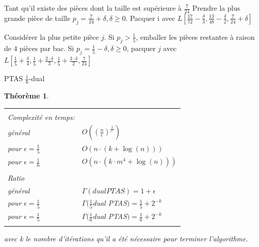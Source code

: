 \documentclass[a4paper,12pt]{report}
\theoremstyle{plain}				%
\newtheorem{theoreme}{Théorème}	%
\theoremstyle{definition}				%
\begin{document}
\begin{algorithm}[H]
Tant qu'il existe des pièces dont la taille est supérieure à $\frac{7}{24}$
Prendre la plus grande pièce de taille $p_j = \frac{7}{24}+\delta, \delta \geq 0$.
Pacquer i avec
$L[\frac{17}{72}-\frac{\delta}{3},
   \frac{13}{48}-\frac{\delta}{2},
   \frac{7}{24}+\delta]$

Considérer la plus petite pièce $j$.
Si $p_j>\frac{1}{5}$, emballer les pièces restantes à raison de $4$ pièces par bac.
Si $p_j=\frac{1}{5}-\delta, \delta \geq 0$, pacquer $j$ avec
$L[\frac{1}{5}+\frac{\delta}{4},
   \frac{1}{5}+\frac{2 \cdot \delta}{3},
   \frac{1}{5}+\frac{3 \cdot \delta}{2},
   \frac{7}{24}]$

\BlankLine %



\caption{PTAS $\frac{1}{6}$-dual}
\label{algo:PTASDual1_6}
\end{algorithm}

\bigskip

\begin{theoreme}
\begin{flushleft}
\begin{tabular}{|p{8cm}p{6cm}|}
\hline
& \\
Complexité en temps:& \\
général&
	$ O(( \frac{n}{\epsilon})^\frac{1}{\epsilon ^ 2})$\\
pour $ \epsilon = \frac{1}{5}$ &
	$O(n \cdot (k + \log(n)))$ \\
pour $ \epsilon = \frac{1}{6}$ &
	$O(n \cdot (k \cdot m^4 + \log(n)))$

\\	%
& \\
Ratio & \\
général &
	$\Gamma(dual PTAS) = 1 + \epsilon$\\

pour $ \epsilon = \frac{1}{5}$ &
	$\Gamma(\frac{1}{5}$dual PTAS$) = \frac{1}{5} + 2^{-k}$\\

pour $ \epsilon = \frac{1}{5}$ &
	$\Gamma(\frac{1}{6}$dual PTAS$) = \frac{1}{6} + 2^{-k}$
\\
& \\
\hline
\end{tabular}
\end{flushleft}
avec k le nombre d'itérations qu'il a été nécessaire pour terminer l'algorithme.
\end{theoreme}
\end{document}
